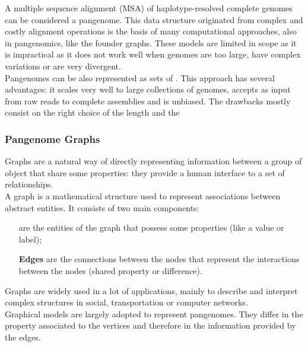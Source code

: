 A multiple sequence alignment (MSA) of haplotype-resolved complete genomes can be considered a pangenome. This data structure originated from complex and costly alignment operations is the basis of many computational approaches, also in pangenomics, like the founder graphs. These models are limited in scope as it is impractical as it does not work well when genomes are too large, have complex variations or are very divergent.\\
Pangenomes can be also represented as sets of \kmers. This approach has several advantages: it scales very well to large collections of genomes, accepts as input from raw reads to complete assemblies and is unbiased. The drawbacks mostly consist on the right choice of the \kmer length and the 


\subsubsection{Pangenome Graphs}
Graphs are a natural way of directly representing information between a group of object that share some properties: they provide a human interface to a set of relationships. \\
A graph is a mathematical structure used to represent associations between abstract entities. It consists of two main components:
\begin{itemize}[leftmargin=1.8cm]
	\item[\smash{\stackunder{\textbf{Nodes}}{\textbf{(vertices)}}}] are the entities of the graph that possess some properties (like a value or label);
	\item[\textbf{Edges}] are the connections between the nodes that represent the interactions between the nodes (shared property or difference).
\end{itemize}
Graphs are widely used in a lot of applications, mainly to describe and interpret complex structures in social, transportation or computer networks.\\
Graphical models are largely adopted to represent pangenomes. They differ in the property associated to the vertices and therefore in the information provided by the edges.
